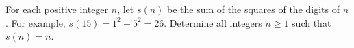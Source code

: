For each positive integer $n$,  let $s(n)$ be the sum of the squares of the digits of $n$. For example, $s(15)=1^2+5^2=26$. Determine all integers $n\geq 1$ such that $s(n)=n$.